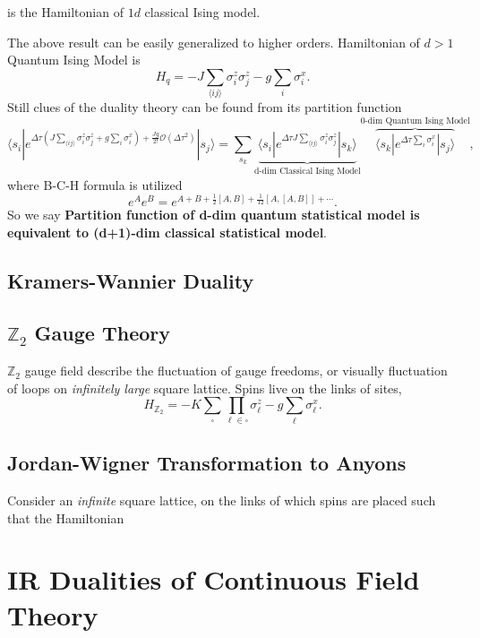 \documentclass[10pt,nofootinbib]{revtex4}
\numberwithin{equation}{section}
\begin{document}
		is the Hamiltonian of $1d$ classical Ising model.\par
		The above result can be easily generalized to higher orders. Hamiltonian of $d>1$ Quantum Ising Model is
		\begin{equation}\label{1.2.1}
			H_q=-J\sum_{\langle ij\rangle}\sigma_i^z\sigma_j^z-g\sum_i\sigma_i^x.
		\end{equation}
		Still clues of the duality theory can be found from its partition function
		\begin{equation}\label{1.2.2}
			\langle s_i|e^{\Delta\tau(J\sum_{\langle ij\rangle}\sigma_i^z\sigma_j^z+g\sum_i\sigma_i^x)+\frac{Jg}{2!}\mathcal{O}(\Delta\tau^2)}|s_j\rangle=\sum_{s_k}\underbrace{\langle s_i|e^{\Delta\tau J\sum_{\langle ij\rangle}\sigma_i^z\sigma_j^z}|s_k\rangle}_{\text{d-dim Classical Ising Model}}\overbrace{\langle s_k|e^{\Delta\tau\sum_i\sigma_i^x}|s_j\rangle}^{\text{0-dim  Quantum Ising Model}},
		\end{equation}
		where B-C-H formula is utilized
		\begin{equation*}
			e^{A}e^B=e^{A+B+\frac12[A,B]+\frac{1}{12}[A,[A,B]]+\cdots}.
		\end{equation*}
		So we say \cite{hsieh2016d} {\color{red}\textbf{Partition function of d-dim quantum statistical model is equivalent to (d+1)-dim classical statistical model}}.
	\subsection{Kramers-Wannier Duality}
	\subsection{$\mathbb{Z}_2$ Gauge Theory}
		$\mathbb{Z}_2$ gauge field describe the fluctuation of gauge freedoms, or visually fluctuation of loops on \emph{infinitely large} square lattice. Spins live on the links of sites, 
		\begin{equation}\label{2.1.1}
			H_{\mathbb{Z}_2}=-K\sum_\square\prod_{\ell\in\square}\sigma_\ell^z-g\sum_\ell\sigma_\ell^x.
		\end{equation}
	\subsection{Jordan-Wigner Transformation to Anyons}
		Consider an \emph{infinite} square lattice, on the links of which spins are placed such that the Hamiltonian

\section{IR Dualities of Continuous Field Theory}
\end{document}
